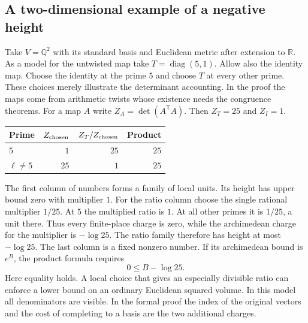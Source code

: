 \documentclass[11pt,letterpaper]{article}
\begin{document}
\subsection{A two-dimensional example of a negative height}
\label{sec:signed-height-model}
Take $V=\mathbb Q^2$ with its standard basis and Euclidean metric after extension to $\mathbb R$. As a model for the untwisted map take $T=\operatorname{diag}(5,1)$. Allow also the identity map. Choose the identity at the prime $5$ and choose $T$ at every other prime. These choices merely illustrate the determinant accounting. In the proof the maps come from arithmetic twists whose existence needs the congruence theorems. For a map $A$ write $Z_A=\det(A^{\mathsf T}A)$. Then $Z_T=25$ and $Z_I=1$.
\begin{center}
\begin{tabular}{@{}lrrr@{}}\toprule
Prime & $Z_{\rm chosen}$ & $Z_T/Z_{\rm chosen}$ & Product\\ \midrule
$5$ & $1$ & $25$ & $25$\\
$\ell\ne5$ & $25$ & $1$ & $25$\\ \bottomrule
\end{tabular}
\end{center}
The first column of numbers forms a family of local units. Its height has upper bound zero with multiplier $1$. For the ratio column choose the single rational multiplier $1/25$. At $5$ the multiplied ratio is $1$. At all other primes it is $1/25$, a unit there. Thus every finite-place charge is zero, while the archimedean charge for the multiplier is $-\log25$. The ratio family therefore has height at most $-\log25$. The last column is a fixed nonzero number. If its archimedean bound is $e^B$, the product formula requires
\[
                          0\le B-\log25 .
\]
Here equality holds. A local choice that gives an especially divisible ratio can enforce a lower bound on an ordinary Euclidean squared volume. In this model all denominators are visible. In the formal proof the index of the original vectors and the cost of completing to a basis are the two additional charges.
\end{document}
